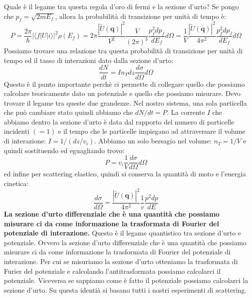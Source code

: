 Quale è il legame tra questa regola d'oro di fermi e la sezione d'urto? Se pongo che $p_f=\sqrt{2mE_f}$, allora la probabilità di transizione per unità di tempo è:
\begin{equation*}
     P={\frac {2\pi }{\hbar }}\left|\langle f|U|i\rangle \right|^{2}\rho (E_{f})=2\pi\frac{\left|\tilde{U}(\mathbf{q})\right|^2}{V^2}\frac{V}{(2\pi)^3}\frac{p_f^2dp_f}{dE_f}d\Omega=\frac{1}{V}\frac{\left|\tilde{U}(\mathbf{q})\right|^2}{4\pi^2}\frac{p_f^2dp_f}{dE_f}d\Omega
\end{equation*}
Possiamo trovare una relazione tra questa probabilità di transizione per unità di tempo ed il tasso di interazioni dato dalla sezione d'urto:
\begin{equation*}
    \frac{dN}{dt}=In_Tdz\frac{d\sigma}{d\Omega}d\Omega
\end{equation*}
Questo è il punto importante perchè ci permette di collegare quello che possiamo calcolare teoricamente dato un potenziale e quello che possiamo misurare. Devo trovare il legame tra queste due grandezze. Nel nostro sistema, una sola particella che può cambiare stato quindi abbiamo che $dN/dt=P$. La corrente $I$ che abbiamo dentro la sezione d'urto è data dal rapporto del numero di particelle incidenti $(=1)$ e il tempo che le particelle impiegano ad attraversare il volume di interazione: $I=1/(dz/v_i)$. Abbiamo un solo bersagio nel volume: $n_T=1/V$ e quindi sostituendo ed eguagliando trovo:
\begin{equation*}
     P=v_i\frac{1}{V}\frac{d\sigma}{d\Omega}d\Omega
\end{equation*}
ed infine per scattering elastico, quindi si conserva la quantità di moto e l'energia cinetica:
\begin{equation*}
    \frac{d\sigma}{d\Omega}=\frac{\left|\tilde{U}(\mathbf{q})\right|^2}{4\pi^2}\frac{1}{v}\frac{p^2dp}{dE}
\end{equation*}
\textbf{La sezione d'urto differenziale che è una quantità che possiamo misurare ci da come informazione la trasformata di Fourier del potenziale di interazione.} Questo è il legame quantistico tra sezione d'urto e potenziale. Ovvero la sezione d'urto differenziale che è una quantità che possiamo misurare ci da come informazione la trasformata di Fourier del potenziale di interazione. Per cui se misuriamo la sezione d'urto otteniamo la trasformata di Furier del potenziale e calcolando l'antitrasformata possiamo calcolarci il potenziale. Viceversa se sappiamo come è fatto il potenziale possiamo calcolarci la sezione d'urto. Su questa identià si basano tutti i nostri esperimenti di scattering.

